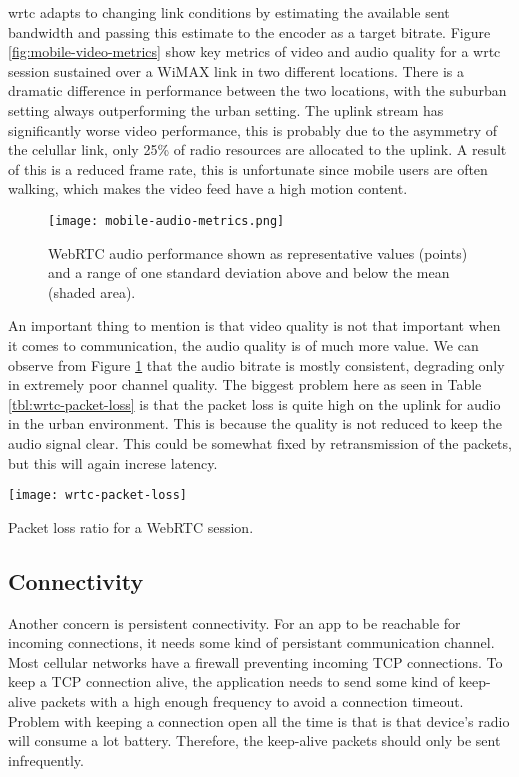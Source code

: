 \gls{wrtc} adapts to changing link conditions by estimating the available sent bandwidth and passing this estimate to the encoder as a target bitrate. Figure \ref{fig:mobile-video-metrics} show key metrics of video and audio quality for a \gls{wrtc} session sustained over a WiMAX link in two different locations. There is a dramatic difference in performance between the two locations, with the suburban setting always outperforming the urban setting. The uplink stream has significantly worse video performance, this is probably due to the asymmetry of the celullar link, only 25\% of radio resources are allocated to the uplink\cite{fund2013performance}. A result of this is a reduced frame rate, this is unfortunate since mobile users are often walking, which makes the video feed have a high motion content.

\pagebreak
\begin{figure}[here]
\centerline{\texttt{[image: mobile-audio-metrics.png]}}
\caption{WebRTC audio performance shown as representative values
(points) and a range of one standard deviation above and below the
mean (shaded area).}
\label{fig:mobile-audio-metrics}
\end{figure}

An important thing to mention is that video quality is not that important when it comes to communication, the audio quality is of much more value\cite{fund2013performance}. We can observe from Figure \ref{fig:mobile-audio-metrics} that the audio bitrate is mostly consistent, degrading only in extremely poor channel quality. The biggest problem here as seen in Table \ref{tbl:wrtc-packet-loss} is that the packet loss is quite high on the uplink for audio in the urban environment. This is because the quality is not reduced to keep the audio signal clear. This could be somewhat fixed by retransmission of the packets, but this will again increse latency.
\\
\begin{table}[here]
\centerline{\texttt{[image: wrtc-packet-loss]}}
\caption{Packet loss ratio for a WebRTC session.}
\label{tbl:wrtc-packet-loss}
\end{table}

\subsection{Connectivity}
Another concern is persistent connectivity. For an app to be reachable for incoming connections, it needs some kind of persistant communication channel. Most cellular networks have a firewall preventing incoming TCP connections\cite{isomaki2012considerations}. To keep a TCP connection alive, the application needs to send some kind of keep-alive packets with a high enough frequency to avoid a connection timeout. Problem with keeping a connection open all the time is that is that device's radio will consume a lot battery. Therefore, the keep-alive packets should only be sent infrequently.


